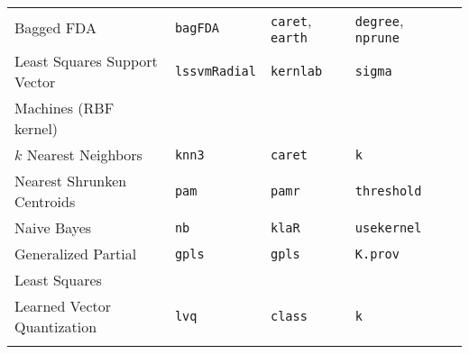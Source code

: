 \documentclass[12pt]{article}
\begin{document}
\begin{longtable}{lllll}
      Bagged FDA &
         \texttt{bagFDA} & 
            \texttt{caret},  \texttt{earth}       & 
            \texttt{degree}, \texttt{nprune} \\      
            
      Least Squares Support Vector  &
         \texttt{lssvmRadial} & 
            \texttt{kernlab}       & 
            \texttt{sigma} \\            
      \:\:  Machines (RBF kernel) & & &\\   
      
                
      $k$ Nearest Neighbors &
         \texttt{knn3} & 
            \texttt{caret}       & 
            \texttt{k} \\   
                  
      Nearest Shrunken Centroids &
         \texttt{pam} & 
            \texttt{pamr}       & 
            \texttt{threshold} \\  
                                                                   
      Naive Bayes &
         \texttt{nb} & 
            \texttt{klaR}       & 
            \texttt{usekernel} \\
        
      Generalized Partial &
         \texttt{gpls} & 
            \texttt{gpls}       & 
            \texttt{K.prov} \\
      \:\: Least Squares \\
      
      Learned Vector Quantization &
         \texttt{lvq} & 
            \texttt{class}       &          
            \texttt{k} \\            
\label{label-name}
\end{longtable}
\end{document}
